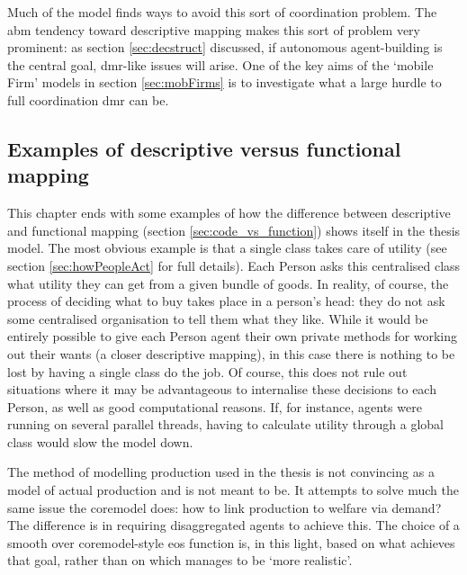{Much of the model finds ways to avoid this sort of coordination problem. The \gls{abm} tendency toward descriptive mapping makes this sort of problem very prominent: as section \ref{sec:decstruct} discussed, if autonomous agent-building is the central goal, \gls{dmr}-like issues will arise. One of the key aims of the `mobile Firm' models in section \ref{sec:mobFirms} is to investigate what a large hurdle to full coordination \gls{dmr} can be.


\subsection{Examples of descriptive versus functional mapping \label{sec:examplesmapping}}

This chapter ends with some examples of how the difference between descriptive and functional mapping (section \ref{sec:code_vs_function}) shows itself in the thesis model. The most obvious example is that a single class takes care of utility (see section \ref{sec:howPeopleAct} for full details). Each Person asks this centralised class what utility they can get from a given bundle of goods. In reality, of course, the process of deciding what to buy takes place in a person's head: they do not ask some centralised organisation to tell them what they like. While it would be entirely possible to give each Person agent their own private methods for working out their wants (a closer descriptive mapping), in this case there is nothing to be lost by having a single class do the job.  Of course, this does not rule out situations where it may be advantageous to internalise these decisions to each Person, as well as good computational reasons. If, for instance, agents were running on several parallel threads, having to calculate utility through a global class would slow the model down.

The method of modelling production used in the thesis is not convincing as a model of actual production and is not meant to be. It attempts to solve much the same issue the \gls{coremodel} does: how to link production to welfare via demand? The difference is in requiring disaggregated agents to achieve this. The choice of a smooth over \gls{coremodel}-style \gls{eos} function is, in this light, based on what achieves that goal, rather than on which manages to be `more realistic'. 

}
